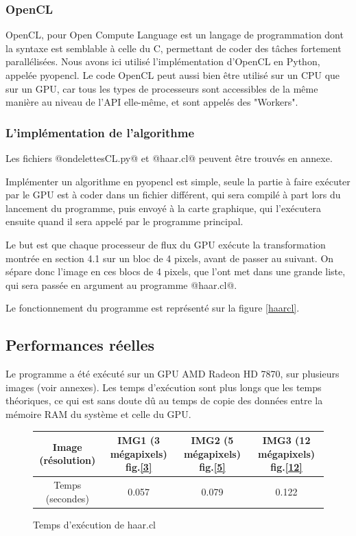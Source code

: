 \documentclass{article}
\begin{document}
\subsubsection{OpenCL}

OpenCL, pour Open Compute Language est un langage de programmation dont la syntaxe est semblable à celle du C, permettant de coder des tâches fortement parallélisées. Nous avons ici utilisé l'implémentation d'OpenCL en Python, appelée pyopencl. Le code OpenCL peut aussi bien être utilisé sur un CPU que sur un GPU, car tous les types de processeurs sont accessibles de la même manière au niveau de l'API elle-même, et sont appelés des "Workers".


\subsubsection{L'implémentation de l'algorithme}

Les fichiers @ondelettesCL.py@ et @haar.cl@ peuvent être trouvés en annexe.

Implémenter un algorithme en pyopencl est simple, seule la partie à faire exécuter par le GPU est à coder dans un fichier différent, qui sera compilé à part lors du lancement du programme, puis envoyé à la carte graphique, qui l'exécutera ensuite quand il sera appelé par le programme principal. 

Le but est que chaque processeur de flux du GPU exécute la transformation montrée en section 4.1 sur un bloc de 4 pixels, avant de passer au suivant. On sépare donc l'image en ces blocs de 4 pixels, que l'ont met dans une grande liste, qui sera passée en argument au programme @haar.cl@.

Le fonctionnement du programme est représenté sur la figure \ref{haarcl}.

\subsection{Performances réelles}

Le programme a été exécuté sur un GPU AMD Radeon HD 7870, sur plusieurs images (voir annexes). Les temps d'exécution sont plus longs que les temps théoriques, ce qui est sans doute dû au temps de copie des données entre la mémoire RAM du système et celle du GPU.

\begin{figure}[!h]
\begin{center}
\begin{tabular}{|c|c|c|c|}
\hline
Image (résolution) & IMG1 (3 mégapixels) fig.\ref{3}  & IMG2 (5 mégapixels) fig.\ref{5}   &   IMG3 (12 mégapixels) fig.\ref{12}  \\ 
\hline
Temps (secondes) & 0.057  & 0.079   &   0.122 \\
\hline
\end{tabular}
\end{center}
\caption{Temps d'exécution de haar.cl}
\label{tab7}
\end{figure}
\end{document}
